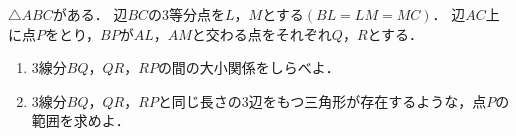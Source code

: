 \documentclass[../../main.tex]{subfiles}
\begin{document}
$\triangle ABC$がある．
辺$BC$の3等分点を$L$，$M$とする$(BL=LM=MC)$．
辺$AC$上に点$P$をとり，$BP$が$AL$，$AM$と交わる点をそれぞれ$Q$，$R$とする．
\begin{enumerate}
  \item 3線分$BQ$，$QR$，$RP$の間の大小関係をしらべよ．
  \item 3線分$BQ$，$QR$，$RP$と同じ長さの3辺をもつ三角形が存在するような，点$P$の範囲を求めよ．
\end{enumerate}
\end{document}
